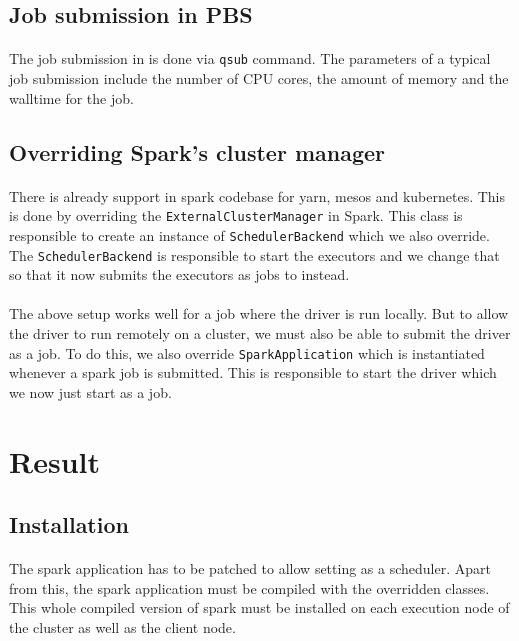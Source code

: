 \subsection{Job submission in PBS}
\paragraph{}
The job submission in  is done via \texttt{qsub} command. The
parameters of a typical job submission include the number of CPU cores, the
amount of memory and the \gls{walltime} for the job.

\subsection{Overriding Spark's cluster manager}
\paragraph{}
There is already support in \gls{spark} codebase for \gls{yarn}, \gls{mesos} and
\gls{kubernetes}. This is done by overriding the \texttt{ExternalClusterManager}
in Spark. This class is responsible to create an instance of
\texttt{SchedulerBackend} which we also override. The \texttt{SchedulerBackend}
is responsible to start the \glspl{executor} and we change that so that it
now submits the \glspl{executor} as jobs to  instead.

\paragraph{}
The above setup works well for a job where the \gls{driver} is run locally. But
to allow the \gls{driver} to run remotely on a cluster, we must also be able to
submit the \gls{driver} as a  job. To do this, we also override
\texttt{SparkApplication} which is instantiated whenever a \gls{spark} job is
submitted. This is responsible to start the \gls{driver} which we now just start
as a  job.


\section{Result}

\subsection{Installation}
\paragraph{}
The \gls{spark} application has to be patched to allow setting 
as a scheduler. Apart from this, the \gls{spark} application must be compiled
with the overridden classes. This whole compiled version of \gls{spark} must be
installed on each execution node of the cluster as well as the client node.

